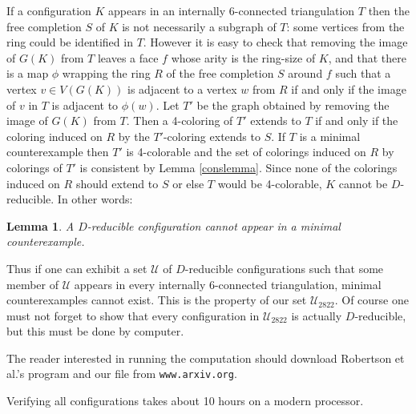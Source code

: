 \documentclass[11pt]{article}
\newtheorem{lemma}[theorem]{Lemma}     %
\newcommand{\mcal}{\mathcal}
\newcommand{\ncmath}{2822}
\newcommand{\arxurl}{{\tt www.arxiv.org}}
\newif\ifarxiv
\begin{document}
If a configuration $K$ appears in an internally 6-connected triangulation $T$ then the free completion $S$ of $K$ is not necessarily a subgraph of $T$: some vertices from the ring could be identified in $T$. However it is easy
to check that removing the image of $G(K)$ from $T$ leaves a face $f$ whose arity is the ring-size of $K$, and that there is a map $\phi$ wrapping the ring $R$ of the free completion $S$ around $f$ such that a vertex $v \in V(G(K))$ is adjacent to a vertex $w$ from $R$ if and only if the image of $v$ in $T$ is adjacent to $\phi(w)$. Let $T'$ be the graph obtained by removing the image of $G(K)$ from $T$. Then a 4-coloring of $T'$ extends to $T$ if and only if the coloring induced on $R$ by the $T'$-coloring extends to $S$. If $T$ is a minimal counterexample then $T'$ is 4-colorable and the set of colorings induced on $R$ by colorings of $T'$ is consistent by Lemma \ref{conslemma}. Since none of the colorings induced on $R$ should extend to $S$ or else $T$ would be 4-colorable, $K$ cannot be $D$-reducible.
In other words:

\begin{lemma}\label{cannot}
A $D$-reducible configuration cannot appear in a minimal counterexample.
\end{lemma}

\noindent Thus if one can exhibit a set $\mcal{U}$ of $D$-reducible configurations such that some member of $\mcal{U}$ appears in every internally 6-connected triangulation, minimal counterexamples cannot exist. This is the property of our set $\mcal{U}_{\ncmath}$. Of course one must not forget to show that every configuration in $\mcal{U}_{\ncmath}$ is actually $D$-reducible, but this must be done by computer. 
\ifarxiv
The reader interested in running the computation should consult the README file.
\else
The reader interested in running the computation should download Robertson et al.'s program and our file from \arxurl. 
\fi
Verifying all configurations takes about 10 hours on a modern processor.

\fivefivepairfig
\end{document}
